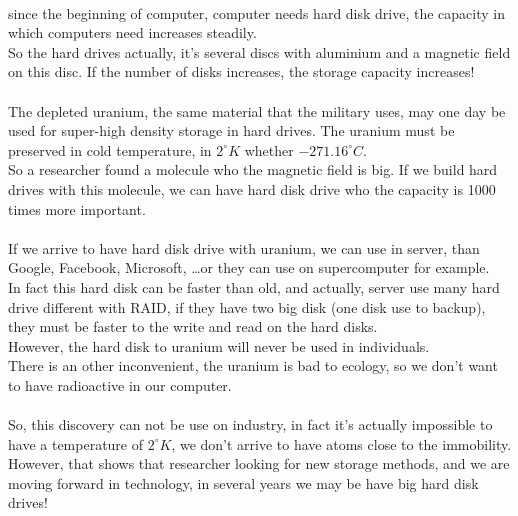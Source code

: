 \documentclass{article}
\title{\titre}
\date{Antoine de \textsc{Roquemaurel}
Group B\newline \newline \today
}
\begin{document}
\maketitle
\paragraph{}
	since the beginning of computer, computer needs hard disk drive, the capacity in which computers need increases steadily.\\
	So the hard drives actually, it's several discs with aluminium and a magnetic field on this disc. If the number of disks increases,
	the storage capacity increases!
	\paragraph{}
	The depleted uranium, the same material that the military uses, may one day be used for super-high density storage in hard drives.
	The uranium must be preserved in cold temperature, in $2^{\circ}K$ whether $-271.16^{\circ}C$. \\
	So a researcher found a molecule who the magnetic field is big. If we build hard drives with this molecule, we can have hard disk drive
	who the capacity is 1000 times more important. 
	\paragraph{}
	If we arrive to have hard disk drive with uranium, we can use in server, than Google, Facebook, Microsoft, \ldots or they can use on supercomputer for example. \\
	In fact this hard disk can be faster than old, and actually, server use many hard drive different with RAID, if they have
	two big disk (one disk use to backup), they must be faster to the write and read on the hard disks. \\
	However, the hard disk to uranium will never be used in individuals.  \\
	There is an other inconvenient, the uranium is bad to ecology, so we don't want to have radioactive in our computer. 
	\paragraph{}
	So, this discovery can not be use on industry, in fact it's actually impossible to have a temperature of $2^{\circ}K$, we don't arrive to have
	atoms close to the immobility.\\
	However, that shows that researcher looking for new storage methods, and we are moving forward in technology, in several years we may be
	have big hard disk drives! 
\end{document}
